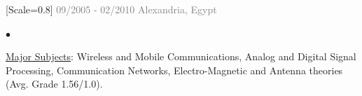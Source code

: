 {[Scale=0.8]
\textcolor{gray}{
\faCalendar\hspace{4pt}09/2005 - 02/2010\hspace{1.5em}
\faMapMarker*\hspace{4pt}Alexandria, Egypt
}}\\[-15pt]

{\setmainfont{Rubik Light}\fontsize{10}{13}\selectfont
\color{gray}
\begin{list}{$\bullet$}{
  \setlength{\topsep}{2pt}
  \setlength{\itemsep}{2pt}
  \setlength{\parsep}{0pt}
  \setlength{\parskip}{0pt}
  \setlength{\leftmargin}{12pt}
  \setlength{\labelsep}{4pt}
}
  \item \underline{Major Subjects}: Wireless and Mobile Communications, Analog and 
Digital Signal Processing, Communication Networks, Electro-Magnetic and Antenna theories (Avg. Grade 1.56/1.0).
\end{list}
}




